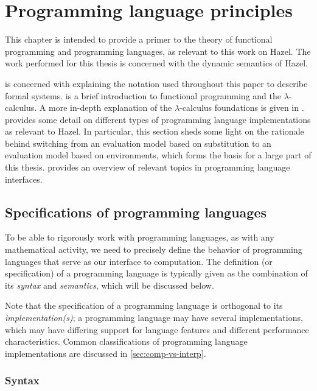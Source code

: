 \chapter{Programming language principles}
\label{sec:prog_lang_principles}

This chapter is intended to provide a primer to the theory of functional programming and programming languages, as relevant to this work on Hazel. The work performed for this thesis is concerned with the dynamic semantics of Hazel.

 is concerned with explaining the notation used throughout this paper to describe formal systems.  is a brief introduction to functional programming and the $\lambda$-calculus. A more in-depth explanation of the $\lambda$-calculus foundations is given in .  provides some detail on different types of programming language implementations as relevant to Hazel. In particular, this section sheds some light on the rationale behind switching from an evaluation model based on substitution to an evaluation model based on environments, which forms the basis for a large part of this thesis.  provides an overview of relevant topics in programming language interfaces.

\section{Specifications of programming languages}
\label{sec:prog-lang-def}

To be able to rigorously work with programming languages, as with any mathematical activity, we need to precisely define the behavior of programming languages that serve as our interface to computation. The definition (or specification) of a programming language is typically given as the combination of its \textit{syntax} and \textit{semantics}, which will be discussed below.

Note that the specification of a programming language is orthogonal to its \textit{implementation(s)}; a programming language may have several implementations, which may have differing support for language features and different performance characteristics. Common classifications of programming language implementations are discussed in \cref{sec:comp-vs-interp}.

\subsection{Syntax}
\label{sec:syntax}

